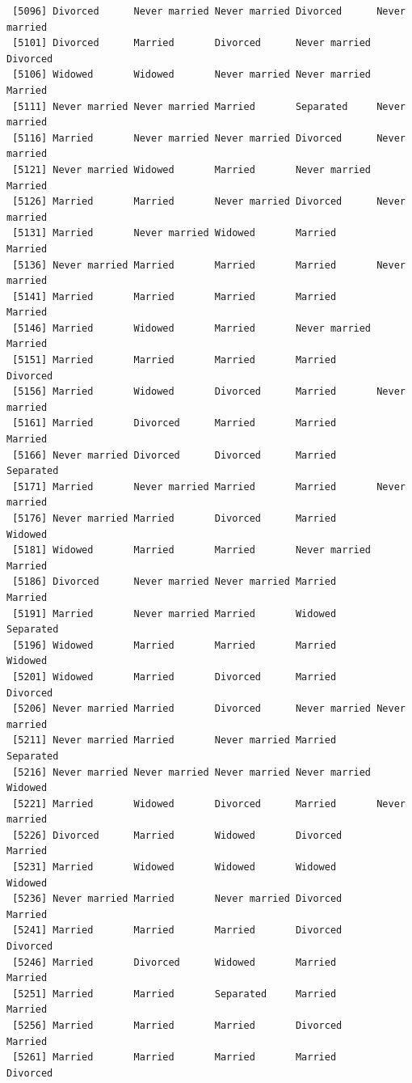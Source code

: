 \documentclass[
  letterpaper,
  DIV=11,
  numbers=noendperiod,
  oneside]{scrartcl}
\begin{document}
\begin{verbatim}
 [5096] Divorced      Never married Never married Divorced      Never married
 [5101] Divorced      Married       Divorced      Never married Divorced     
 [5106] Widowed       Widowed       Never married Never married Married      
 [5111] Never married Never married Married       Separated     Never married
 [5116] Married       Never married Never married Divorced      Never married
 [5121] Never married Widowed       Married       Never married Married      
 [5126] Married       Married       Never married Divorced      Never married
 [5131] Married       Never married Widowed       Married       Married      
 [5136] Never married Married       Married       Married       Never married
 [5141] Married       Married       Married       Married       Married      
 [5146] Married       Widowed       Married       Never married Married      
 [5151] Married       Married       Married       Married       Divorced     
 [5156] Married       Widowed       Divorced      Married       Never married
 [5161] Married       Divorced      Married       Married       Married      
 [5166] Never married Divorced      Divorced      Married       Separated    
 [5171] Married       Never married Married       Married       Never married
 [5176] Never married Married       Divorced      Married       Widowed      
 [5181] Widowed       Married       Married       Never married Married      
 [5186] Divorced      Never married Never married Married       Married      
 [5191] Married       Never married Married       Widowed       Separated    
 [5196] Widowed       Married       Married       Married       Widowed      
 [5201] Widowed       Married       Divorced      Married       Divorced     
 [5206] Never married Married       Divorced      Never married Never married
 [5211] Never married Married       Never married Married       Separated    
 [5216] Never married Never married Never married Never married Widowed      
 [5221] Married       Widowed       Divorced      Married       Never married
 [5226] Divorced      Married       Widowed       Divorced      Married      
 [5231] Married       Widowed       Widowed       Widowed       Widowed      
 [5236] Never married Married       Never married Divorced      Married      
 [5241] Married       Married       Married       Divorced      Divorced     
 [5246] Married       Divorced      Widowed       Married       Married      
 [5251] Married       Married       Separated     Married       Married      
 [5256] Married       Married       Married       Divorced      Married      
 [5261] Married       Married       Married       Married       Divorced     

\end{verbatim}
\end{document}
